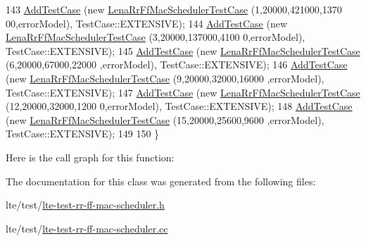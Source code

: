 \begin{DoxyCode}
143   \hyperlink{classns3_1_1TestCase_a3718088e3eefd5d6454569d2e0ddd835}{AddTestCase} (\textcolor{keyword}{new} \hyperlink{classLenaRrFfMacSchedulerTestCase}{LenaRrFfMacSchedulerTestCase} (1,20000,421000,1370
      00,errorModel), TestCase::EXTENSIVE);
144   \hyperlink{classns3_1_1TestCase_a3718088e3eefd5d6454569d2e0ddd835}{AddTestCase} (\textcolor{keyword}{new} \hyperlink{classLenaRrFfMacSchedulerTestCase}{LenaRrFfMacSchedulerTestCase} (3,20000,137000,4100
      0,errorModel), TestCase::EXTENSIVE);
145   \hyperlink{classns3_1_1TestCase_a3718088e3eefd5d6454569d2e0ddd835}{AddTestCase} (\textcolor{keyword}{new} \hyperlink{classLenaRrFfMacSchedulerTestCase}{LenaRrFfMacSchedulerTestCase} (6,20000,67000,22000
      ,errorModel), TestCase::EXTENSIVE);
146   \hyperlink{classns3_1_1TestCase_a3718088e3eefd5d6454569d2e0ddd835}{AddTestCase} (\textcolor{keyword}{new} \hyperlink{classLenaRrFfMacSchedulerTestCase}{LenaRrFfMacSchedulerTestCase} (9,20000,32000,16000
      ,errorModel), TestCase::EXTENSIVE);
147   \hyperlink{classns3_1_1TestCase_a3718088e3eefd5d6454569d2e0ddd835}{AddTestCase} (\textcolor{keyword}{new} \hyperlink{classLenaRrFfMacSchedulerTestCase}{LenaRrFfMacSchedulerTestCase} (12,20000,32000,1200
      0,errorModel), TestCase::EXTENSIVE);
148   \hyperlink{classns3_1_1TestCase_a3718088e3eefd5d6454569d2e0ddd835}{AddTestCase} (\textcolor{keyword}{new} \hyperlink{classLenaRrFfMacSchedulerTestCase}{LenaRrFfMacSchedulerTestCase} (15,20000,25600,9600
      ,errorModel), TestCase::EXTENSIVE);
149 
150 \}
\end{DoxyCode}


Here is the call graph for this function\+:




The documentation for this class was generated from the following files\+:\begin{DoxyCompactItemize}
\item 
lte/test/\hyperlink{lte-test-rr-ff-mac-scheduler_8h}{lte-\/test-\/rr-\/ff-\/mac-\/scheduler.\+h}\item 
lte/test/\hyperlink{lte-test-rr-ff-mac-scheduler_8cc}{lte-\/test-\/rr-\/ff-\/mac-\/scheduler.\+cc}\end{DoxyCompactItemize}
